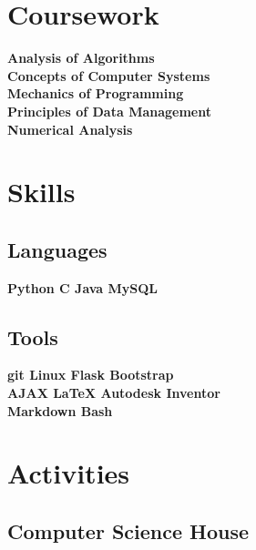 \documentclass[]{deedy-resume-openfont}
\begin{document}
\begin{minipage}[t]{0.30\textwidth}
\section{Coursework}
\textbf{Analysis of Algorithms \\
Concepts of Computer Systems \\
Mechanics of Programming \\
Principles of Data Management \\
Numerical Analysis \\
}


\section{Skills}
\subsection{Languages}
\textbf{Python \textbullet{} C \textbullet{} Java \textbullet{} MySQL \\}

\vspace{\topsep} %

\subsection{Tools}
\textbf{git \textbullet{} Linux \textbullet{} Flask \textbullet{} Bootstrap \\
AJAX \textbullet{} \LaTeX \textbullet{} Autodesk Inventor \\
Markdown \textbullet{} Bash}
\sectionsep


\section{Activities}

\subsection{Computer Science House}


\end{minipage}
\end{document}
